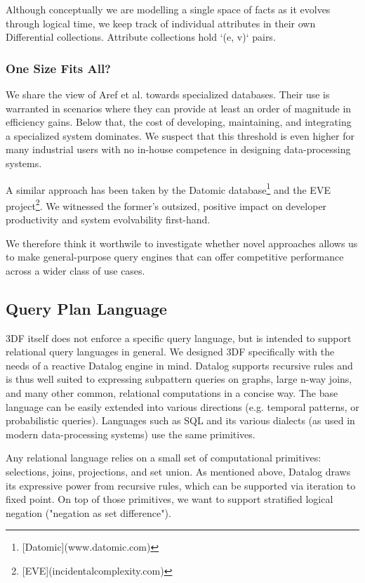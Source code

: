 \documentclass[../index.tex]{subfiles}
\begin{document}
Although conceptually we are modelling a single space of facts as it
evolves through logical time, we keep track of individual attributes
in their own Differential collections. Attribute collections hold `(e,
v)` pairs.

\subsubsection{One Size Fits All?}

We share the view of Aref et al.\footnotemark[1]{} towards specialized
databases. Their use is warranted in scenarios where they can provide
at least an order of magnitude in efficiency gains. Below that, the
cost of developing, maintaining, and integrating a specialized system
dominates. We suspect that this threshold is even higher for many
industrial users with no in-house competence in designing
data-processing systems.

A similar approach has been taken by the Datomic database\footnote{[Datomic](www.datomic.com)} and the
EVE project\footnote{[EVE](incidentalcomplexity.com)}. We witnessed the former's outsized, positive impact on
developer productivity and system evolvability first-hand.

We therefore think it worthwile to investigate whether novel
approaches allows us to make general-purpose query engines that can
offer competitive performance across a wider class of use cases.

\subsection{Query Plan Language}

3DF itself does not enforce a specific query language, but is intended
to support relational query languages in general. We designed 3DF
specifically with the needs of a reactive Datalog engine in
mind. Datalog supports recursive rules and is thus well suited to
expressing subpattern queries on graphs, large n-way joins, and many
other common, relational computations in a concise way. The base
language can be easily extended into various directions (e.g. temporal
patterns, or probabilistic queries). Languages such as SQL and its
various dialects (as used in modern data-processing systems) use the
same primitives.

Any relational language relies on a small set of computational
primitives: selections, joins, projections, and set union. As
mentioned above, Datalog draws its expressive power from recursive
rules, which can be supported via iteration to fixed point. On top of
those primitives, we want to support stratified logical negation
("negation as set difference").
\end{document}
